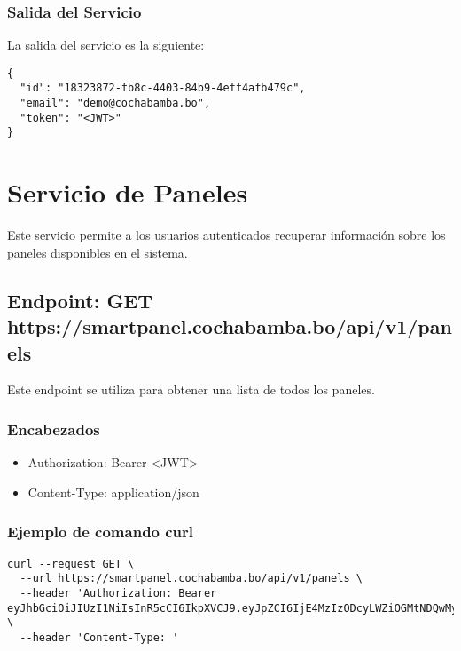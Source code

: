 \documentclass{article}
\begin{document}
\subsubsection{Salida del Servicio}

La salida del servicio es la siguiente:

\begin{verbatim}
{
  "id": "18323872-fb8c-4403-84b9-4eff4afb479c",
  "email": "demo@cochabamba.bo",
  "token": "<JWT>"
}
\end{verbatim}
\newpage

\section{Servicio de Paneles}

Este servicio permite a los usuarios autenticados recuperar información sobre los paneles disponibles en el sistema.

\subsection{Endpoint: GET https://smartpanel.cochabamba.bo/api/v1/panels}

Este endpoint se utiliza para obtener una lista de todos los paneles.

\subsubsection{Encabezados}

\begin{itemize}
\item Authorization: Bearer \textless JWT\textgreater
\item Content-Type: application/json
\end{itemize}

\subsubsection{Ejemplo de comando curl}

\begin{verbatim}
curl --request GET \
  --url https://smartpanel.cochabamba.bo/api/v1/panels \
  --header 'Authorization: Bearer eyJhbGciOiJIUzI1NiIsInR5cCI6IkpXVCJ9.eyJpZCI6IjE4MzIzODcyLWZiOGMtNDQwMy04NGI5LTRlZmY0YWZiNDc5YyIsImlhdCI6MTcxNDc0OTQ3NSwiZXhwIjoxNzE0NzkyNjc1fQ.Ca8Tph3SGAS7MrUswgReYnGbVxvvPpSuG_J7JPrSTXY' \
  --header 'Content-Type: '
\end{verbatim}
\end{document}

